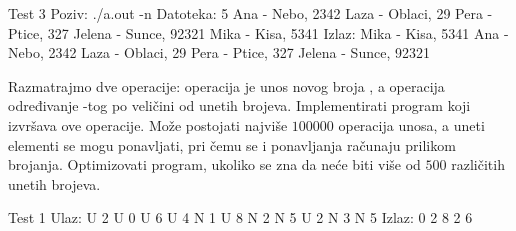 \begin{Exercise}[label=514]
\begin{miditest}
\begin{test}{Test 3}
Poziv: ./a.out -n
Datoteka:  5
           Ana - Nebo, 2342
           Laza - Oblaci, 29
           Pera - Ptice, 327
           Jelena - Sunce, 92321
           Mika - Kisa, 5341
Izlaz:     Mika - Kisa, 5341
           Ana - Nebo, 2342
           Laza - Oblaci, 29
           Pera - Ptice, 327
           Jelena - Sunce, 92321		   
\end{test}
\end{miditest}

\end{Exercise}

\begin{Answer}[ref=514]
\end{Answer}
\begin{Exercise}[difficulty=2, label=515]
  Razmatrajmo dve operacije: operacija  je unos novog broja
  , a operacija  određivanje -tog po
  veličini od unetih brojeva. Implementirati program koji izvršava ove
  operacije. Može postojati najviše $100000$ operacija unosa, a uneti
  elementi se mogu ponavljati, pri čemu se i ponavljanja računaju
  prilikom brojanja.  Optimizovati program,
  ukoliko se zna da neće biti više od $500$ različitih unetih brojeva.
  
\begin{maxitest}
\begin{test}{Test 1}
Ulaz: U 2 U 0 U 6 U 4 N 1 U 8 N 2 N 5 U 2 N 3 N 5
Izlaz: 0 2 8 2 6
\end{test}
\end{maxitest}
  
\end{Exercise}

